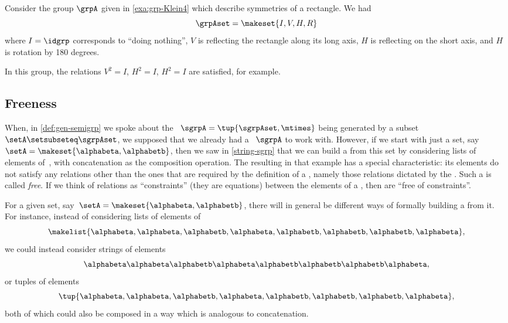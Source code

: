 \begin{example}
    Consider the group $\grpA$ given in \cref{exa:grp-Klein4} which describe symmetries of a rectangle.
    We had
    \begin{equation}
        \grpAset = \makeset{ I, V, H, R}
    \end{equation}
    where $I = \idgrp$ corresponds to ``doing nothing'', $V$ is reflecting the rectangle along its long axis, $H$ is reflecting on the short axis, and $H$ is rotation by 180 degrees.

    In this group, the relations $V^2 = I$, $H^2 = I$, $H^2 = I$ are satisfied, for example.
\end{example}

\subsection{Freeness}

When, in \cref{def:gen-semigrp} we spoke about the ~$\sgrpA = \tup{\sgrpAset, \mtimes}$  being generated by a subset~$\setA \setsubseteq \sgrpAset$, we supposed that we already had a ~$\sgrpA$ to work with.
However, if we start with just a set, say~$\setA = \makeset{ \alphabeta, \alphabetb}$, then we saw in \cref{string-sgrp} that we can build a  from this set by considering lists of elements of~\setA, with concatenation as the composition operation.
The resulting  in that example has a special characteristic: its elements do not satisfy any relations other than the ones that are required by the definition of a   , namely those relations dictated by the .
Such a  is called \emph{free}.
If we think of relations as ``constraints'' (they are equations) between the elements of a  , then  are ``free of constraints''.

For a given set, say~$\setA = \makeset{ \alphabeta, \alphabetb}$, there will in general be different ways of formally building a  from it.
For instance, instead of considering lists of elements of~\setA
\begin{equation}
    \makelist{\alphabeta,\alphabeta, \alphabetb, \alphabeta, \alphabetb, \alphabetb, \alphabetb, \alphabeta},
\end{equation}
we could instead consider strings of elements
\begin{equation}
    \alphabeta\alphabeta \alphabetb \alphabeta \alphabetb \alphabetb \alphabetb \alphabeta,
\end{equation}
or tuples of elements
\begin{equation}
    \tup{\alphabeta, \alphabeta,  \alphabetb,  \alphabeta,  \alphabetb,  \alphabetb,  \alphabetb,  \alphabeta},
\end{equation}
both of which could also be composed in a way which is analogous to concatenation.

